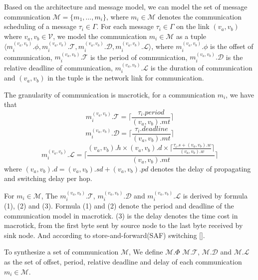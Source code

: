 \documentclass[conference]{IEEEtran}
\begin{document}
Based on the architecture and message model, we can model the set of message communication $\mathcal{M}=\{ m_{1},\dots,m_{i}\}$, where $m_{i}\in\mathcal{M}$ denotes the communication scheduling of a message $\tau_{i}\in\Gamma$. For each message $\tau_{i}\in\Gamma$ on the link $(v_{a},v_{b}) $ where $v_{a},v_{b}\in\mathcal{V}$, we model the communication $m_{i}\in\mathcal{M}$ as a tuple  $\langle m_{i}^{(v_{a},v_{b})}.\phi, m_{i}^{(v_{a},v_{b})}.\mathcal{T}, m_{i}^{(v_{a},v_{b})}.\mathcal{D},m_{i}^{(v_{a},v_{b})}.\mathcal{L} \rangle$, where $ m_{i}^{(v_{a},v_{b})}.\phi$ is the offset of communication, $ m_{i}^{(v_{a},v_{b})}.\mathcal{T} $ is the period of communication, $m_{i}^{(v_{a},v_{b})}.\mathcal{D}$ is the relative deadline of communication, $m_{i}^{(v_{a},v_{b})}.\mathcal{L}$ is the duration of communication and $(v_{a},v_{b})$ in the tuple is the network link for communication.

The granularity of communication is macrotick, for a communication $m_{i}$, we have that
\begin{equation}
	m_{i}^{(v_{a},v_{b})}.\mathcal{T} =\lceil\frac{\tau_{i}.period}{ (v_{a},v_{b}).mt} \rceil
\end{equation}
\begin{equation}
m_{i}^{(v_{a},v_{b})}.\mathcal{D}=\lceil\frac{\tau_{i}.deadline}{(v_{a},v_{b}).mt}\rceil
\end{equation}
\begin{equation}
m_{i}^{(v_{a},v_{b})}.\mathcal{L}=
\lceil\frac{(v_{a},v_{b}).h\times(v_{a},v_{b}).d\times\lceil\frac{\tau_{i}.s+(v_{a},v_{b}).w}{(v_{a},v_{b}).w}\rceil}{(v_{a},v_{b}).mt}\rceil
\end{equation}
where $(v_{a},v_{b}).d = (v_{a},v_{b}).sd+(v_{a},v_{b}).pd $ denotes the delay of propagating and switching delay per hop.

For $m_{i}\in \mathcal{M}$, The $m_{i}^{(v_{a},v_{b})}.\mathcal{T}$, $m_{i}^{(v_{a},v_{b})}.\mathcal{D}$ and $m_{i}^{(v_{a},v_{b})}.\mathcal{L}$ is derived by formula (1), (2) and (3). Formula (1) and (2) denote the period and deadline of the communication model in macrotick. (3) is the delay denotes the time cost in macrotick, from the first byte sent by source node to the last byte received by sink node. And according to store-and-forward(SAF) switching [].



To synthesize a set of communication $\mathcal{M}$, We define $\mathcal{M}.\Phi$ $\mathcal{M.T}$, $\mathcal{M.D}$ and $\mathcal{M.L}$ as the set of offset, period, relative deadline and delay of each communication $m_{i}\in \mathcal{M}$.
\end{document}
